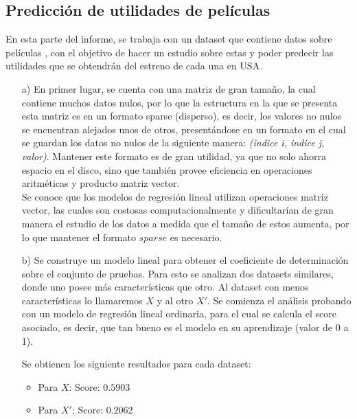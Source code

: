 \documentclass[10pt]{article}
\begin{document}
\subsection{Predicción de utilidades de películas}

En esta parte del informe, se trabaja con un dataset que contiene datos sobre películas \cite{joshi2010movie}, con el objetivo de hacer un estudio sobre estas y poder predecir las utilidades que se obtendrán del estreno de cada una en USA.

\begin{itemize}

\item[a)] En primer lugar, se cuenta con una matriz de gran tamaño, la cual contiene muchos datos nulos, por lo que la estructura en la que se presenta esta matriz es en un formato sparse (disperso), es decir, los valores no nulos se encuentran alejados unos de otros, presentándose en un formato en el cual se guardan los datos no nulos de la siguiente manera: \textit{(indice i, indice j, valor)}. Mantener este formato es de gran utilidad, ya que no solo ahorra espacio en el disco, sino que también provee eficiencia en operaciones aritméticas y producto matriz vector. \\
Se conoce que los modelos de regresión lineal utilizan operaciones matriz vector, las cuales son costosas computacionalmente y dificultarían de gran manera el estudio de los datos a medida que el tamaño de estos aumenta, por lo que mantener el formato $sparse$ es necesario.

\item[b)] Se construye un modelo lineal para obtener el coeficiente de determinación sobre el conjunto de pruebas. Para esto se analizan dos datasets similares, donde uno posee más características que otro. Al dataset con menos características lo llamaremos $X$ y al otro $X'$.
Se comienza el análisis probando con un modelo de regresión lineal ordinaria, para el cual se calcula el score asociado, es decir, que tan bueno es el modelo en su aprendizaje (valor de 0 a 1).

Se obtienen los siguiente resultados para cada dataset:

\begin{itemize}

\item Para $X$: Score: $0.5903$
\item Para $X'$: Score: $0.2062$ 

\end{itemize}


\end{itemize}
\end{document}
